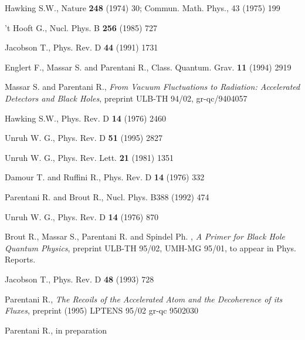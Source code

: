 \documentclass[12pt]{article}
\begin{document}
\begin{thebibliography}{999}

Hawking S.W., Nature {\bf  248} (1974) 30;
Commun. Math. Phys., 43 (1975) 199


 't Hooft G., Nucl. Phys. B {\bf 256} (1985) 727


 Jacobson T., Phys. Rev. D {\bf 44} (1991) 1731

 Englert F., Massar S. and Parentani R.,
 Class. Quantum. Grav. {\bf 11} (1994) 2919

Massar S. and Parentani R., {\em From Vacuum Fluctuations to
Radiation: Accelerated Detectors and Black Holes}, preprint ULB-TH 94/02, gr-qc/9404057


 Hawking S.W., Phys. Rev. D {\bf 14}  (1976)  2460 

Unruh W. G., Phys. Rev. D {\bf 51}  (1995)  2827


Unruh W. G., Phys. Rev. Lett. {\bf 21} (1981) 1351

Damour T. and Ruffini R., Phys. Rev. D {\bf 14} (1976) 332

Parentani R. and Brout R., Nucl. Phys. B388 (1992) 474

Unruh W. G., Phys. Rev. D {\bf  14} (1976) 870


 Brout R., Massar S., Parentani R. and Spindel Ph. , {\em A Primer
for Black Hole Quantum Physics}, preprint ULB-TH 95/02, UMH-MG 95/01, 
to appear in Phys. Reports.

 Jacobson T., Phys. Rev. D {\bf 48} (1993) 728

Parentani R., {\em The Recoils of the Accelerated Atom 
and the Decoherence of its Fluxes}, preprint (1995) LPTENS 95/02
gr-qc 9502030

Parentani R., in preparation

\end{thebibliography}
\end{document}
